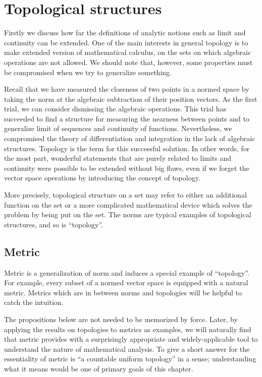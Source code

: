 \chapter{Topological structures}

Firstly we discuss how far the definitions of analytic notions such as limit and continuity can be extended.
One of the main interests in general topology is to make extended version of mathematical calculus, on the sets on which algebraic operations are not allowed.
We should note that, however, some properties must be compromised when we try to generalize something.

Recall that we have measured the closeness of two points in a normed space by taking the norm at the algebraic subtraction of their position vectors.
As the first trial, we can consider dismissing the algebraic operations.
This trial has succeeded to find a structure for measuring the nearness between points and to generalize limit of sequences and continuity of functions.
Nevertheless, we compromised the theory of differentiation and integration in the lack of algebraic structures.
Topology is the term for this successful solution.
In other words, for the most part, wonderful statements that are purely related to limits and continuity were possible to be extended without big flaws, even if we forget the vector space operations by introducing the concept of topology.
 
More precisely, topological structure on a set may refer to either an additional function on the set or a more complicated mathematical device which solves the problem by being put on the set.
The norms are typical examples of topological structures, and so is ``topology''.


\section{Metric}

Metric is a generalization of norm and induces a special example of ``topology''.
For example, every subset of a normed vector space is equipped with a natural metric.
Metrics which are in between norms and topologies will be helpful to catch the intuition.

The propositions below are not needed to be memorized by force.
Later, by applying the results on topologies to metrics as examples, we will naturally find that metric provides with a surprisingly appropriate and widely-applicable tool to understand the nature of mathematical analysis.
To give a short answer for the essentiality of metric is ``a countable uniform topology'' in a sense; understanding what it means would be one of primary goals of this chapter.

